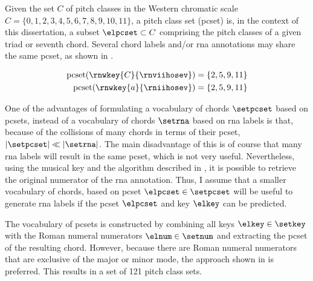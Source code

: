 
Given the set $C$ of pitch classes in the Western chromatic
scale $C = \{0, 1, 2, 3, 4, 5, 6, 7, 8, 9, 10, 11 \}$, a
pitch class set (\gls{pcset}) is, in the context of this
dissertation, a subset $\elpcset \subset C$ comprising the
pitch classes of a given triad or seventh chord. Several
chord labels and/or \gls{rna} annotations may share the same
\gls{pcset}, as shown in .

\begin{equation}
    \label{eq:pcset_collision}
    \begin{split}
        \text{pcset}(\rnwkey{C}{\rnviihosev}) &= \{2, 5, 9, 11 \}\\
        \text{pcset}(\rnwkey{a}{\rniihosev}) &= \{2, 5, 9, 11 \}
    \end{split}
\end{equation}

One of the advantages of formulating a vocabulary of chords
$\setpcset$ based on \gls{pcset}s, instead of a vocabulary
of chords $\setrna$ based on \gls{rna} labels is that,
because of the collisions of many chords in terms of their
\gls{pcset}, $| \setpcset | \ll | \setrna |$. The main
disadvantage of this is of course that many \gls{rna} labels
will result in the same \gls{pcset}, which is not very
useful. Nevertheless, using the musical key and the
algorithm described in
,
it is possible to retrieve the original numerator of the
\gls{rna} annotation. Thus, I assume that a smaller
vocabulary of chords, based on \gls{pcset} $\elpcset \in
\setpcset$ will be useful to generate \gls{rna} labels if
the \gls{pcset} $\elpcset$ and key $\elkey$ can be
predicted.

The vocabulary of \gls{pcset}s is constructed by combining
all keys $\elkey \in \setkey$ with the Roman numeral
numerators $\elnum \in \setnum$ and extracting the
\gls{pcset} of the resulting chord. However, because there
are Roman numeral numerators that are exclusive of the major
or minor mode, the approach shown in  is
preferred. This results in a set of 121 pitch class sets.


